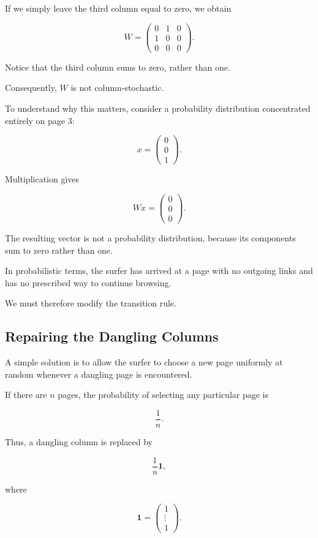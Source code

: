 \documentclass[11pt,a4paper]{article}
\theoremstyle{definition}
\theoremstyle{remark}
\begin{document}
If we simply leave the
third column equal to zero,
we obtain

\[
W=
\begin{pmatrix}
0&1&0\\
1&0&0\\
0&0&0
\end{pmatrix}.
\]

Notice that the third
column sums to zero,
rather than one.

Consequently, $W$ is not
column-stochastic.

To understand why this matters,
consider a probability
distribution concentrated
entirely on page $3$:

\[
x=
\begin{pmatrix}
0\\0\\1
\end{pmatrix}.
\]

Multiplication gives

\[
Wx=
\begin{pmatrix}
0\\0\\0
\end{pmatrix}.
\]

The resulting vector is not
a probability distribution,
because its components sum
to zero rather than one.

In probabilistic terms,
the surfer has arrived
at a page with no outgoing
links and has no prescribed
way to continue browsing.

We must therefore modify
the transition rule.


\subsection{Repairing the Dangling Columns}

A simple solution is to
allow the surfer to choose
a new page uniformly at
random whenever a dangling
page is encountered.

If there are $n$ pages,
the probability of selecting
any particular page is

\[
\frac{1}{n}.
\]

Thus, a dangling column
is replaced by

\[
\frac{1}{n}\mathbf{1},
\]

where

\[
\mathbf{1}=
\begin{pmatrix}
1\\
\vdots\\
1
\end{pmatrix}.
\]
\end{document}

